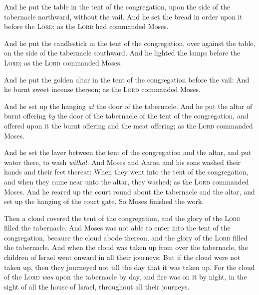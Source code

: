 \documentclass[11pt,letterpaper,oneside]{memoir}
\begin{document}
And he put the table in the tent of the congregation, upon the side of
the tabernacle northward, without the vail. And he set the bread in
order upon it before the \textsc{Lord}; as the \textsc{Lord} had
commanded Moses.

And he put the candlestick in the tent of the congregation, over against
the table, on the side of the tabernacle southward. And he lighted the
lamps before the \textsc{Lord}; as the \textsc{Lord} commanded Moses.

And he put the golden altar in the tent of the congregation before the
vail: And he burnt sweet incense thereon; as the \textsc{Lord} commanded
Moses.

And he set up the hanging \emph{at} the door of the tabernacle. And he
put the altar of burnt offering \emph{by} the door of the tabernacle of
the tent of the congregation, and offered upon it the burnt offering and
the meat offering; as the \textsc{Lord} commanded Moses.

And he set the laver between the tent of the congregation and the altar,
and put water there, to wash \emph{withal. }And Moses and Aaron and his
sons washed their hands and their feet thereat: When they went into the
tent of the congregation, and when they came near unto the altar, they
washed; as the \textsc{Lord} commanded Moses. And he reared up the court
round about the tabernacle and the altar, and set up the hanging of the
court gate. So Moses finished the work.

Then a cloud covered the tent of the congregation, and the glory of the
\textsc{Lord} filled the tabernacle. And Moses was not able to enter
into the tent of the congregation, because the cloud abode thereon, and
the glory of the \textsc{Lord} filled the tabernacle. And when the cloud
was taken up from over the tabernacle, the children of Israel went
onward in all their journeys: But if the cloud were not taken up, then
they journeyed not till the day that it was taken up. For the cloud of
the \textsc{Lord} \emph{was} upon the tabernacle by day, and fire was on
it by night, in the sight of all the house of Israel, throughout all
their journeys.
\end{document}
